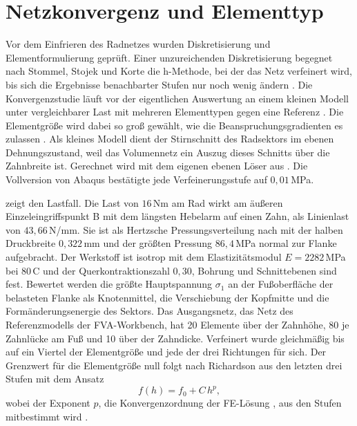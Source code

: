 \section{Netzkonvergenz und Elementtyp}
\label{sec:netzkonvergenz}

Vor dem Einfrieren des Radnetzes wurden Diskretisierung und Elementformulierung geprüft. Einer unzureichenden Diskretisierung begegnet nach Stommel, Stojek und Korte die h-Methode, bei der das Netz verfeinert wird, bis sich die Ergebnisse benachbarter Stufen nur noch wenig ändern \cite[S.~424]{Sto18}. Die Konvergenzstudie läuft vor der eigentlichen Auswertung an einem kleinen Modell unter vergleichbarer Last mit mehreren Elementtypen gegen eine Referenz \cite[S.~433]{Sto18}. Die Elementgröße wird dabei so groß gewählt, wie die Beanspruchungsgradienten es zulassen \cite[S.~465]{Sto18}. Als kleines Modell dient der Stirnschnitt des Radsektors im ebenen Dehnungszustand, weil das Volumennetz ein Auszug dieses Schnitts über die Zahnbreite ist. Gerechnet wird mit dem eigenen ebenen Löser aus . Die Vollversion von Abaqus bestätigte jede Verfeinerungsstufe auf $0{,}01$\,MPa.

 zeigt den Lastfall. Die Last von $16$\,Nm am Rad wirkt am äußeren Einzeleingriffspunkt B mit dem längsten Hebelarm auf einen Zahn, als Linienlast von $43{,}66$\,N/mm. Sie ist als Hertzsche Pressungsverteilung nach \cite{Nie19} mit der halben Druckbreite $0{,}322$\,mm und der größten Pressung $86{,}4$\,MPa normal zur Flanke aufgebracht. Der Werkstoff ist isotrop mit dem Elastizitätsmodul $E = 2282$\,MPa bei $80$\,\textdegree C und der Querkontraktionszahl $0{,}30$, Bohrung und Schnittebenen sind fest. Bewertet werden die größte Hauptspannung $\sigma_{\mathrm{1}}$ an der Fußoberfläche der belasteten Flanke als Knotenmittel, die Verschiebung der Kopfmitte und die Formänderungsenergie des Sektors. Das Ausgangsnetz, das Netz des Referenzmodells der FVA-Workbench, hat 20 Elemente über der Zahnhöhe, 80 je Zahnlücke am Fuß und 10 über der Zahndicke. Verfeinert wurde gleichmäßig bis auf ein Viertel der Elementgröße und jede der drei Richtungen für sich. Der Grenzwert für die Elementgröße null folgt nach Richardson aus den letzten drei Stufen mit dem Ansatz
\begin{equation}
	f(h) = f_{\mathrm{0}} + C\,h^{p},
	\label{eq:richardson}
\end{equation}
wobei der Exponent $p$, die Konvergenzordnung der FE-Lösung \cite[S.~244]{Bat96}, aus den Stufen mitbestimmt wird \cite[S.~523]{DahReu22}.

